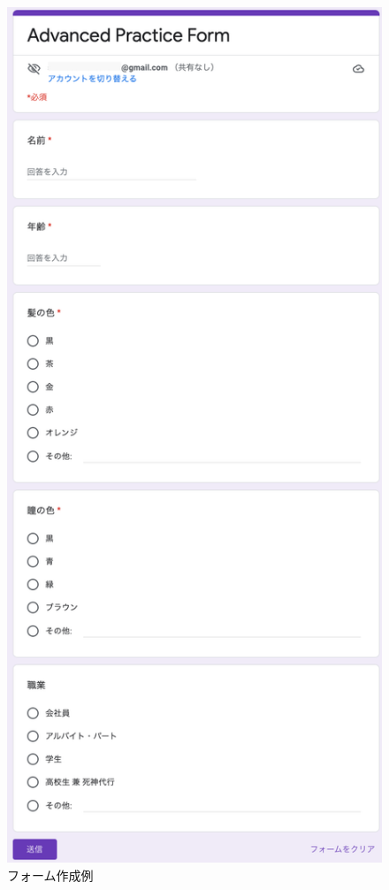 \documentclass[uplatex,a4j]{jsarticle}
\begin{document}
\begin{figure}[H]
 \centering
 \includegraphics[keepaspectratio, scale=0.35]{images/advanced_form.png}
 \caption{フォーム作成例}
 \label{fig:advanced_form}
\end{figure}
\end{document}
